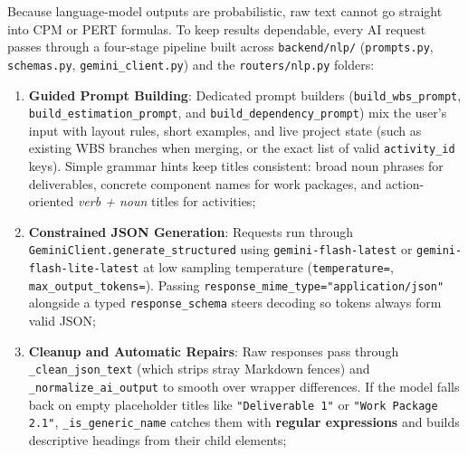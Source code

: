 Because language-model outputs are probabilistic, raw text cannot go straight into CPM or PERT formulas. To keep results dependable, every AI request passes through a four-stage pipeline built across \texttt{backend/\allowbreak nlp/} (\texttt{prompts.py}, \texttt{schemas.py}, \texttt{gemini\_\allowbreak client.py}) and the \texttt{routers/\allowbreak nlp.py} folders:
\begin{enumerate}[leftmargin=2.3em,labelsep=0.6em,itemsep=1.5pt,topsep=1pt]
    \item \textbf{Guided Prompt Building}: Dedicated prompt builders (\texttt{build\_\allowbreak wbs\_\allowbreak prompt}, \texttt{build\_\allowbreak estimation\_\allowbreak prompt}, and \texttt{build\_\allowbreak dependency\_\allowbreak prompt}) mix the user's input with layout rules, short examples, and live project state (such as existing WBS branches when merging, or the exact list of valid \texttt{activity\_id} keys). Simple grammar hints keep titles consistent: broad noun phrases for deliverables, concrete component names for work packages, and action-oriented \textit{verb + noun} titles for activities;
    
    \vspace{1mm}
    
    \item \textbf{Constrained JSON Generation}: Requests run through \texttt{GeminiClient.\allowbreak generate\_\allowbreak structured} using \texttt{gemini-\allowbreak flash-\allowbreak latest} or \texttt{gemini-\allowbreak flash-\allowbreak lite-\allowbreak latest} at low sampling temperature (\texttt{temperature=}, \texttt{max\_\allowbreak output\_\allowbreak tokens=}). Passing \texttt{response\_\allowbreak mime\_\allowbreak type=\allowbreak "application/\allowbreak json"} alongside a typed \texttt{response\_\allowbreak schema} steers decoding so tokens always form valid JSON;
    
    \vspace{1mm}
    
    \item \textbf{Cleanup and Automatic Repairs}: Raw responses pass through \texttt{\_clean\_\allowbreak json\_\allowbreak text} (which strips stray Markdown fences) and \texttt{\_normalize\_\allowbreak ai\_\allowbreak output} to smooth over wrapper differences. If the model falls back on empty placeholder titles like \texttt{"Deliverable 1"} or \texttt{"Work Package 2.1"}, \texttt{\_is\_\allowbreak generic\_\allowbreak name} catches them with \textbf{regular expressions} and builds descriptive headings from their child elements;
    

\end{enumerate}
